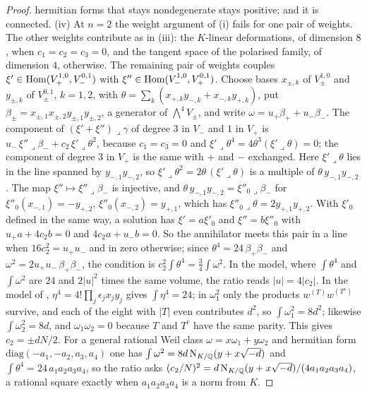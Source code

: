 \begin{proof}
hermitian forms that stays nondegenerate stays positive; and it is
connected. (iv) At $n=2$ the weight argument of
(i) fails for one pair of weights. The other weights
contribute as in (iii): the $K$-linear deformations, of dimension $8$, when
$c_{1}=c_{2}=c_{3}=0$, and the tangent space of the polarised family, of
dimension $4$, otherwise. The remaining pair of weights couples
$\xi'\in\operatorname{Hom}(V_{+}^{1,0},V_{-}^{0,1})$ with
$\xi''\in\operatorname{Hom}(V_{-}^{1,0},V_{+}^{0,1})$. Choose bases $x_{\pm,k}$ of
$V_{\pm}^{1,0}$ and $y_{\pm,k}$ of $V_{\pm}^{0,1}$, $k=1,2$, with
$\theta=\sum_{k}(x_{+,k}y_{-,k}+x_{-,k}y_{+,k})$, put
$\beta_{\pm}=x_{\pm,1}x_{\pm,2}y_{\pm,1}y_{\pm,2}$, a generator of
$\bigwedge^{4}V_{\pm}$, and write $\omega=u_{+}\beta_{+}+u_{-}\beta_{-}$. The component of
$(\xi'+\xi'')\lrcorner\gamma$ of degree $3$ in $V_{-}$ and $1$ in $V_{+}$ is
$u_{-}\,\xi''\lrcorner\beta_{-}+c_{2}\,\xi'\lrcorner\theta^{2}$, because
$c_{1}=c_{3}=0$ and $\xi'\lrcorner\theta^{4}=4\theta^{3}(\xi'\lrcorner\theta)=0$;
the component of degree $3$ in $V_{+}$ is the same with $+$ and $-$
exchanged.
Here $\xi'\lrcorner\theta$ lies in the line spanned by $y_{-,1}y_{-,2}$, so
$\xi'\lrcorner\theta^{2}=2\theta\,(\xi'\lrcorner\theta)$ is a multiple of
$\theta\,y_{-,1}y_{-,2}$. The map $\xi''\mapsto\xi''\lrcorner\beta_{-}$ is
injective, and $\theta\,y_{-,1}y_{-,2}=\xi''_{0}\lrcorner\beta_{-}$ for
$\xi''_{0}(x_{-,1})=-y_{+,2}$, $\xi''_{0}(x_{-,2})=y_{+,1}$, which has
$\xi''_{0}\lrcorner\theta=2y_{+,1}y_{+,2}$. With $\xi'_{0}$ defined in the
same way, a solution has $\xi'=a\xi'_{0}$ and $\xi''=b\xi''_{0}$ with
$u_{+}a+4c_{2}b=0$ and $4c_{2}a+u_{-}b=0$. So the annihilator meets this
pair in a line when $16c_{2}^{2}=u_{+}u_{-}$ and in zero otherwise; since
$\theta^{4}=24\,\beta_{+}\beta_{-}$ and
$\omega^{2}=2u_{+}u_{-}\,\beta_{+}\beta_{-}$, the condition is
$c_{2}^{2}\int\theta^{4}=\frac34\int\omega^{2}$.
In the model, where $\int\theta^{4}$ and $\int\omega^{2}$ are $24$ and
$2|u|^{2}$ times the same volume, the ratio reads $|u|=4|c_{2}|$. In the
model of , $\eta^{4}=4!\prod_{j}\epsilon_{j}x_{j}y_{j}$
gives $\int\eta^{4}=24$; in $\omega_{1}^{2}$ only the products
$w^{(T)}w^{(T^{c})}$ survive, and each of the eight with $|T|$ even contributes
$d^{2}$, so $\int\omega_{1}^{2}=8d^{2}$; likewise $\int\omega_{2}^{2}=8d$, and
$\omega_{1}\omega_{2}=0$ because $T$ and $T^{c}$ have the same parity. This
gives $c_{2}=\pm dN/2$. For a general rational
Weil class $\omega=x\omega_{1}+y\omega_{2}$ and hermitian form
$\mathrm{diag}(-a_{1},-a_{2},a_{3},a_{4})$ one has
$\int\omega^{2}=8d\,\mathrm{N}_{K/\mathbb{Q}}(y+x\sqrt{-d})$ and
$\int\theta^{4}=24\,a_{1}a_{2}a_{3}a_{4}$, so the ratio asks
$(c_{2}/N)^{2}=d\,\mathrm{N}_{K/\mathbb{Q}}(y+x\sqrt{-d})/(4a_{1}a_{2}a_{3}a_{4})$, a rational
square exactly when $a_{1}a_{2}a_{3}a_{4}$ is a norm from $K$.
\end{proof}

